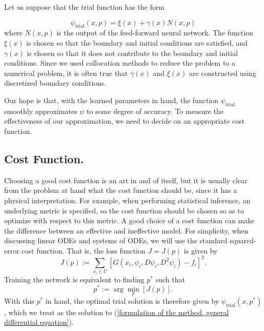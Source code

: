 \documentclass[10pt]{article}
\theoremstyle{plain}
\theoremstyle{definition}
\theoremstyle{remark}
\numberwithin{theorem}{section}
\numberwithin{proposition}{section}
\numberwithin{remark}{section}
\numberwithin{corollary}{section}
\numberwithin{definition}{section}
\numberwithin{lemma}{section}
\numberwithin{equation}{section}
\DeclareMathOperator{\T}{trial}
\begin{document}
Let us suppose that the trial function has the form 

\begin{equation}
	\label{formulation of the method, form of the trial function}
	\displaystyle \psi_{\T}(x,p) = \xi(x) + \gamma(x) N(x,p)
\end{equation}
where $N(x,p)$ is the output of the feed-forward neural network. The function $\xi(x)$ is chosen so that the boundary and initial conditions are satisfied, and $\gamma(x)$ is chosen so that it does not contribute to the boundary and initial conditions. Since we used collocation methods to reduce the problem to a numerical problem, it is often true that $\gamma(x)$ and $\xi(x)$ are constructed using discretized boundary conditions. 

Our hope is that, with the learned parameters in hand, the function $\psi_{\T}$ smoothly approximates $\psi$ to some degree of accuracy. To measure the effectiveness of our approximation, we need to decide on an appropriate cost function. 

\subsection{Cost Function.}
Choosing a good cost function is an art in and of itself, but it is usually clear from the problem at hand what the cost function should be, since it has a physical interpretation. For example, when performing statistical inference, an underlying metric is specified, so the cost function should be chosen so as to optimize with respect to this metric. A good choice of a cost function can make the difference between an effective and ineffective model. For simplicity, when discussing linear ODEs and systems of ODEs, we will use the standard squared-error cost function. That is, the loss function $J = J(p)$ is given by 
\begin{equation}
	\label{formulation of the method, cost function for ODEs}
	\displaystyle J(p) := \sum\limits_{x_i \in U}{[ G(x_i, \psi_i, D\psi_i, D^2\psi_i) - f_i ]^2}.
\end{equation}
Training the network is equivalent to finding $p^*$ such that 
\begin{equation*}
	\displaystyle p^* := \arg\min_{p}{[J(p)]}.
\end{equation*}
With this $p^*$ in hand, the optimal trial solution is therefore given by $\psi_{\T}(x,p^*)$, which we treat as the solution to (\ref{formulation of the method, general differential equation}). 
\end{document}
